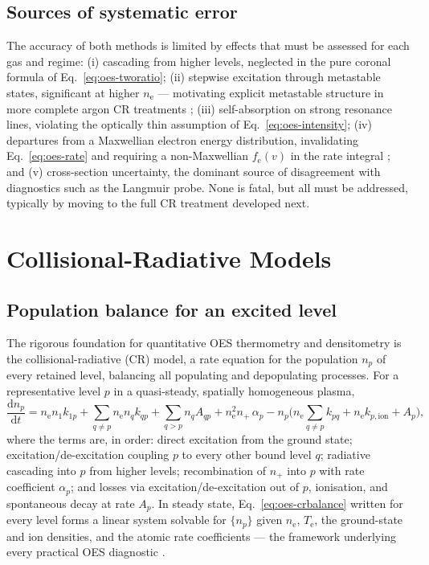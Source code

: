 \subsection{Sources of systematic error}

The accuracy of both methods is limited by effects that must be assessed for each gas and regime: (i) cascading from higher levels, neglected in the pure coronal formula of Eq.~\eqref{eq:oes-tworatio}; (ii) stepwise excitation through metastable states, significant at higher $n_{\mathrm{e}}$ — motivating explicit metastable structure in more complete argon CR treatments \cite{ref0290}; (iii) self-absorption on strong resonance lines, violating the optically thin assumption of Eq.~\eqref{eq:oes-intensity}; (iv) departures from a Maxwellian electron energy distribution, invalidating Eq.~\eqref{eq:oes-rate} and requiring a non-Maxwellian $f_{\mathrm{e}}(v)$ in the rate integral \cite{ref0290}; and (v) cross-section uncertainty, the dominant source of disagreement with diagnostics such as the Langmuir probe. None is fatal, but all must be addressed, typically by moving to the full CR treatment developed next.

\section{Collisional-Radiative Models}
\label{sec:oes-crmodel}

\subsection{Population balance for an excited level}

The rigorous foundation for quantitative OES thermometry and densitometry is the collisional-radiative (CR) model, a rate equation for the population $n_{p}$ of every retained level, balancing all populating and depopulating processes. For a representative level $p$ in a quasi-steady, spatially homogeneous plasma,
\begin{equation}
\frac{\mathrm{d}n_{p}}{\mathrm{d}t} =
n_{\mathrm{e}} n_{1} k_{1p}
+ \sum_{q\neq p} n_{\mathrm{e}} n_{q} k_{qp}
+ \sum_{q>p} n_{q} A_{qp}
+ n_{\mathrm{e}}^{2} n_{+}\, \alpha_{p}
- n_{p}\Big( n_{\mathrm{e}} \sum_{q\neq p} k_{pq} + n_{\mathrm{e}} k_{p,\mathrm{ion}} + A_{p} \Big),
\label{eq:oes-crbalance}
\end{equation}
where the terms are, in order: direct excitation from the ground state; excitation/de-excitation coupling $p$ to every other bound level $q$; radiative cascading into $p$ from higher levels; recombination of $n_{+}$ into $p$ with rate coefficient $\alpha_{p}$; and losses via excitation/de-excitation out of $p$, ionisation, and spontaneous decay at rate $A_{p}$. In steady state, Eq.~\eqref{eq:oes-crbalance} written for every level forms a linear system solvable for $\{n_{p}\}$ given $n_{\mathrm{e}}$, $T_{\mathrm{e}}$, the ground-state and ion densities, and the atomic rate coefficients — the framework underlying every practical OES diagnostic \cite{ref0237,ref0245,ref0260}.

